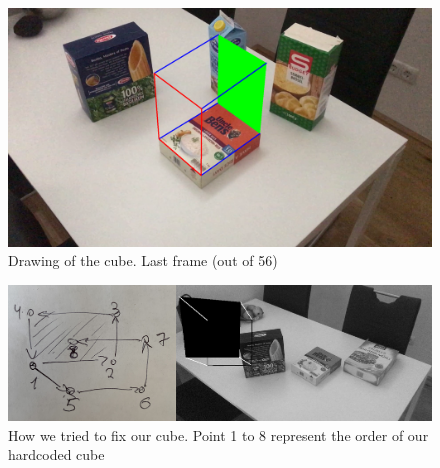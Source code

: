 \documentclass[paper=a4, fontsize=11pt]{scrartcl}
\numberwithin{equation}{section}		%
\numberwithin{figure}{section}			%
\numberwithin{table}{section}				%
\begin{document}
\begin{figure}[h!]
\centering
\includegraphics[width=1\textwidth]{img/lastframe}
\caption{Drawing of the cube. Last frame (out of 56)}
\end{figure}

\begin{figure}[h!]
\centering
\includegraphics[width=1\textwidth]{img/tryingCube}
\caption{How we tried to fix our cube. Point 1 to 8 represent the order of our hardcoded cube}
\end{figure}
\end{document}
